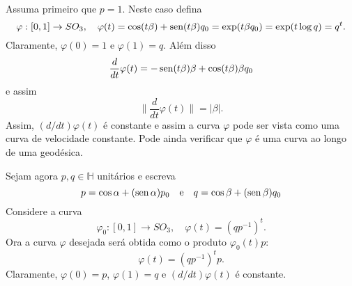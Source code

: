 \documentclass[12pt]{amsart}
\newcommand{\Ha}{\mathbb H}
\DeclareMathOperator{\sen}{\textrm{\rm sen}}
\theoremstyle{definition}
\begin{document}
Assuma primeiro que $p=1$. Neste caso defina 
\[
    \varphi:[0,1]\to SO_3,\quad \varphi(t)=\cos(t\beta)+\sen(t\beta)q_0=\exp(t\beta q_0)=
    \exp(t\log q)=q^t.
\]
Claramente, $\varphi(0)=1$ e $\varphi(1)=q$. Além disso 
\[
    \frac d{dt}\varphi(t)=-\sen(t\beta)\beta+\cos(t\beta)\beta q_0
\]
e assim 
\[
    \|\frac d{dt}\varphi(t)\|=|\beta|.
\]
Assim, $(d/dt)\varphi(t)$ é constante e assim a curva $\varphi$ pode ser vista como uma curva de velocidade
constante. Pode ainda verificar que $\varphi$ é uma curva ao longo de uma geodésica. 

Sejam agora $p,q\in\Ha$ unitários e escreva 
\[
p=\cos\alpha+(\sen\alpha)p_0\quad\mbox{e}\quad q=\cos\beta+(\sen\beta)q_0
\]
Considere a curva 
\[
    \varphi_0:[0,1]\to SO_3,\quad \varphi(t)=(qp^{-1})^t.
\]
Ora a curva $\varphi$ desejada será obtida como o produto $\varphi_0(t)p$:
\[
    \varphi(t)=(qp^{-1})^tp.
\]
Claramente, $\varphi(0)=p$, $\varphi(1)=q$ e $(d/dt)\varphi(t)$ é constante. 
\end{document}

